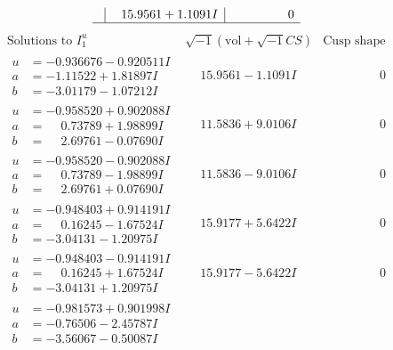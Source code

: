 \documentclass[1p]{elsarticle_modified}
\theoremstyle{definition}
\newcommand{\I}{\sqrt{-1}}
\begin{document}
$$\begin{array}{c|c|c}
 & \phantom{-}15.9561 + 1.1091 I & \phantom{-0.000000 } 0\\
 \hline 
 \end{array}$$\newpage$$\begin{array}{c|c|c}  
\text{Solutions to }I^u_{1}& \I (\text{vol} + \sqrt{-1}CS) & \text{Cusp shape}\\
 \hline 
\begin{aligned}
u &= -0.936676 - 0.920511 I \\
a &= -1.11522 + 1.81897 I \\
b &= -3.01179 - 1.07212 I\end{aligned}
 & \phantom{-}15.9561 - 1.1091 I & \phantom{-0.000000 } 0 \\ \hline\begin{aligned}
u &= -0.958520 + 0.902088 I \\
a &= \phantom{-}0.73789 + 1.98899 I \\
b &= \phantom{-}2.69761 - 0.07690 I\end{aligned}
 & \phantom{-}11.5836 + 9.0106 I & \phantom{-0.000000 } 0 \\ \hline\begin{aligned}
u &= -0.958520 - 0.902088 I \\
a &= \phantom{-}0.73789 - 1.98899 I \\
b &= \phantom{-}2.69761 + 0.07690 I\end{aligned}
 & \phantom{-}11.5836 - 9.0106 I & \phantom{-0.000000 } 0 \\ \hline\begin{aligned}
u &= -0.948403 + 0.914191 I \\
a &= \phantom{-}0.16245 - 1.67524 I \\
b &= -3.04131 - 1.20975 I\end{aligned}
 & \phantom{-}15.9177 + 5.6422 I & \phantom{-0.000000 } 0 \\ \hline\begin{aligned}
u &= -0.948403 - 0.914191 I \\
a &= \phantom{-}0.16245 + 1.67524 I \\
b &= -3.04131 + 1.20975 I\end{aligned}
 & \phantom{-}15.9177 - 5.6422 I & \phantom{-0.000000 } 0 \\ \hline\begin{aligned}
u &= -0.981573 + 0.901998 I \\
a &= -0.76506 - 2.45787 I \\
b &= -3.56067 - 0.50087 I\end{aligned}

\end{array}$$
\end{document}
